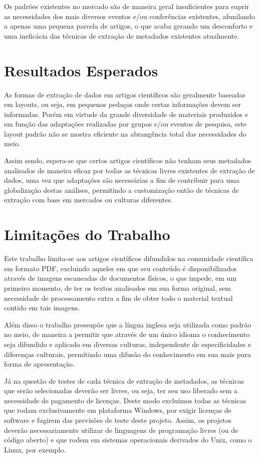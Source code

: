 \documentclass[
	12pt,               %
	openright,          %
	twoside,            %
	a4paper,            %
	english,            %
	brazil              %
	]{abntex2}
\begin{document}
Os padrões existentes no mercado são de maneira geral insuficientes para suprir as necessidades dos mais diversos eventos e/ou conferências existentes, afunilando a apenas uma pequena parcela de artigos, o que acaba gerando um desconforto e uma ineficácia das técnicas de extração de metadados existentes atualmente.

\section{Resultados Esperados}

As formas de extração de dados em artigos científicos são geralmente baseadas em layouts, ou seja, em pequenos pedaços onde certas informações devem ser informadas. Porém em virtude da grande diversidade de materiais produzidos e em função das adaptações realizadas por grupos e/ou eventos de pesquisa, este layout padrão não se mostra eficiente na abrangência total das necessidades do meio. 

Assim sendo, espera-se que certos artigos científicos não tenham seus metadados analisados de maneira eficaz por todas as técnicas livres existentes de extração de dados, uma vez que adaptações são necessárias a fim de contribuir para uma globalização destas análises, permitindo a customização então de técnicas de extração com base em mercados ou culturas diferentes.

\section{Limitações do Trabalho}

Este trabalho limita-se aos artigos científicos difundidos na comunidade científica em formato PDF, excluindo aqueles em que seu conteúdo é disponibilizados através de imagens escaneadas de documentos físicos, o que impede, em um primeiro momento, de ter os textos analisados em sua forma original, sem necessidade de processamento extra a fim de obter todo o material textual contido em tais imagens.

Além disso o trabalho pressupõe que a língua inglesa seja utilizada como padrão no meio, de maneira a permitir que através de um único idioma o conhecimento seja difundido e aplicado em diversas culturas, independente de especificidades e diferenças culturais, permitindo uma difusão do conhecimento em sua mais pura forma de apresentação.


Já na questão de testes de cada técnica de extração de metadados, as técnicas que serão selecionadas deverão ser livres, ou seja, ter seu uso liberado sem a necessidade de pagamento de licenças. Deste modo excluímos todas as técnicas que rodam exclusivamente em plataforma Windows, por exigir licenças de software e fugirem das previsões de teste deste projeto. Assim, os projetos deverão necessariamente utilizar de linguagens de programação livres (ou de código aberto) e que rodem em sistemas operacionais derivados do Unix, como o Linux, por exemplo.
\end{document}
